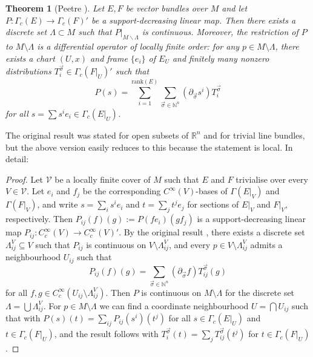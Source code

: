 \documentclass{article}
\newcommand{\N}{\mathbb{N}}
\newcommand{\R}{\mathbb{R}}
\newtheorem{Theorem}{Theorem}[section]
\theoremstyle{definition}
\begin{document}
\begin{Theorem}[Peetre \cite{peetreRectificationArticleCaracterisation1960}] \label{thm:peetre} Let $E,F$ be vector bundles over $M$ and let $P:\Gamma_c(E)\to \Gamma_c(F)'$ be a support-decreasing linear map. Then there exists a discrete set $\Lambda\subset M$ such that $P|_{M\backslash \Lambda}$ is continuous. 
Moreover, the restriction of $P$ to $M\setminus \Lambda$ is a differential operator of locally finite order: for any $p\in M\setminus \Lambda$, there 
exists a chart $(U,x)$ and frame $\{e_i\}$ of $E_U$ and finitely many nonzero distributions $T^{\vec{\sigma}}_{i}\in \Gamma_c(F|_U)'$
such that 
\[
P(s) =\sum_{i=1}^{\mathrm{rank}(E)} \sum_{\vec{\sigma} \in \mathbb{N}^{n}}
\left(\partial_{\vec{\sigma}} s^{i}\right) 
T^{\vec{\sigma}}_{i}
\]
for all $s=\sum s^ie_i \in \Gamma_{c}(E|_{U})$. 
\end{Theorem}


The original result \cite{peetreRectificationArticleCaracterisation1960} was stated for open subsets of $\R^n$ and for trivial line bundles, 
but the above version easily reduces to this because the statement is local. In detail:
\begin{proof}
Let $\mathcal{V}$ be a locally finite cover of $M$ such that $E$ and $F$ trivialise over every $V\in \mathcal{V}$.
Let $e_i$ and $f_j$ be the corresponding $C^{\infty}(V)$-bases of $\Gamma(E|_{V})$ 
 and $\Gamma(F|_{V})$, and write $s = \sum_i s^i e_i$ and $t = \sum_{j} t^j e_{j}$ for sections of $E|_{V}$ and $F|_{V}$, respectively.
 Then $P_{ij}(f)(g) := P(fe_i)(gf_j)$ is a support-decreasing linear map $P_{ij} \colon C_{c}^{\infty}(V) \rightarrow C^{\infty}_{c}(V)'$. By the original result
 \cite{peetreRectificationArticleCaracterisation1960}, there exists a discrete set $\Lambda^{V}_{ij}\subseteq V$ such that 
 $P_{ij}$ is continuous on $V\setminus \Lambda^{V}_{ij}$, and every $p\in V\setminus \Lambda^{V}_{ij}$ admits 
 a neighbourhood $U_{ij}$ such that 
 \[P_{ij}(f)(g) = \sum_{\vec{\sigma}\in \N^{n}} \left(\partial_{\vec{\sigma}}f\right) T^{\vec{\sigma}}_{ij}(g)\] 
 for all $f, g \in C^{\infty}_{c}(U_{ij}\setminus \Lambda^{V}_{ij})$. Then $P$ is continuous on $M\setminus \Lambda$ for 
 the discrete set $\Lambda = \bigcup \Lambda^{V}_{ij}$. For $p\in M\setminus \Lambda$ we can find a coordinate neighbourhood $U = \bigcap U_{ij}$ such that
 with $P(s)(t) = \sum_{ij}P_{ij}(s^i)(t^j)$ for all $s\in \Gamma_{c}(E|_{U})$ and $t\in \Gamma_{c}(F|_{U})$, and the result follows with 
 $T^{\vec{\sigma}}_{i}(t) = \sum_{j}T^{\vec{\sigma}}_{ij}(t^{j})$ for $t \in \Gamma_{c}(F|_{U})$.
\end{proof}
\end{document}
